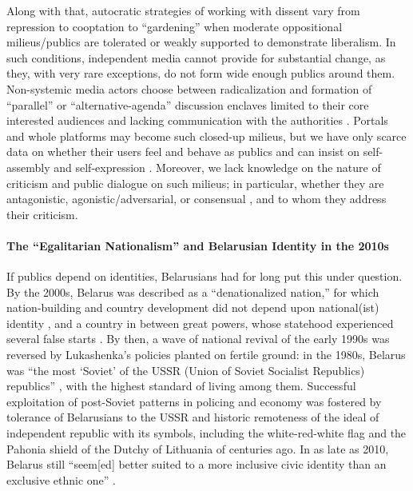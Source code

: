 Along with that, autocratic strategies of working with dissent vary from repression to cooptation to “gardening” \cite{LitvinenkoToepfl} when moderate oppositional milieus/publics are tolerated or weakly supported to demonstrate liberalism. In such conditions, independent media cannot provide for substantial change, as they, with very rare exceptions, do not form wide enough publics around them. Non-systemic media actors choose between radicalization and formation of “parallel” \cite{Kiriya2012} or “alternative-agenda” \cite{BodrunovaLitvinenko2015} discussion enclaves limited to their core interested audiences and lacking communication with the authorities \cite{Shirokanova}. Portals and whole platforms may become such closed-up milieus, but we have only scarce data on whether their users feel and behave as publics and can insist on self-assembly and self-expression \cite{Shirky}. Moreover, we lack knowledge on the nature of criticism and public dialogue on such milieus; in particular, whether they are antagonistic, agonistic/adversarial, or consensual \cite{Mouffe}, and to whom they address their criticism.

\paragraph{The “Egalitarian Nationalism” and Belarusian Identity in the 2010s}
If publics depend on identities, Belarusians had for long put this under question. By the 2000s, Belarus was described as a “denationalized nation,” for which nation-building and country development did not depend upon national(ist) identity \cite{Marples}, and a country in between great powers, whose statehood experienced several false starts \cite[p.~xi]{Wilson2021}. By then, a wave of national revival of the early 1990s was reversed by Lukashenka’s policies planted on fertile ground: in the 1980s, Belarus was “the most ‘Soviet’ of the USSR (Union of Soviet Socialist Republics) republics” \cite[p.~337]{Leshchenko}, with the highest standard of living among them. Successful exploitation of post-Soviet patterns in policing and economy was fostered by tolerance of Belarusians to the USSR and historic remoteness of the ideal of independent republic with its symbols, including the white-red-white flag and the Pahonia shield of the Dutchy of Lithuania of centuries ago. In as late as 2010, Belarus still “seem[ed] better suited to a more inclusive civic identity than an exclusive ethnic one” \cite{BuhrShadurskiHoffman}.

